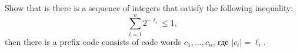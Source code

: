 Show that is there is a sequence of integers that satisfy the following inequality:
$$
    \sum_{i = 1}^{n} 2^{-\ell_i} \le 1,
$$    
then there is a prefix code consists of code words $c_1, \dots, c_n$, где $|c_i| = \ell_i$.
